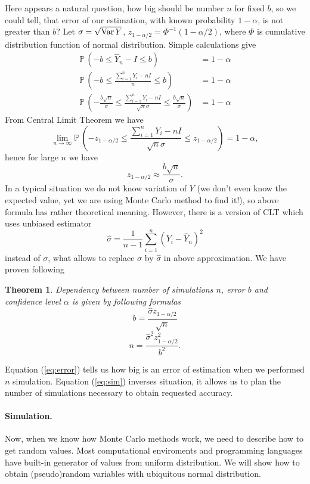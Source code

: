 \documentclass[a4paper,12pt, twoside]{article}
\newtheorem{thm}{Theorem}[section]
\theoremstyle{definition}
\theoremstyle{remark}
\def\Var{{\rm Var}\,}
\def\P{{\mathbb{P}}\,}
\def\limn{\lim\limits_{n \rightarrow \infty} }
\begin{document}
Here appears a natural question, how big should be number $n$ for fixed $b$, so we could tell, that error of our estimation, with known probability $1-\alpha$, is not greater than $b$?
Let $\sigma = \sqrt{\Var{Y}}$, $z_{1-\alpha/2} = \Phi^{-1}(1-\alpha/2)$, where $\Phi$ is cumulative distribution function of normal distribution. Simple calculations give
\begin{align*}
 \P(-b \leq \hat{Y}_n - I \leq b) &= 1 - \alpha\\
 \P(-b \leq \frac{\sum\limits_{i=1}^n Y_i - nI}{n}  \leq b) &= 1 - \alpha\\
 \P(-\frac{b\sqrt{n}}{\sigma} \leq \frac{\sum\limits_{i=1}^n Y_i - nI}{\sqrt{n}\sigma}  \leq \frac{b\sqrt{n}}{\sigma}) &= 1 - \alpha
\end{align*}
From Central Limit Theorem we have
\[ \limn \P(-z_{1-\alpha/2} \leq \frac{\sum\limits_{i=1}^n Y_i - nI}{\sqrt{n}\sigma}  \leq z_{1-\alpha/2}) = 1 - \alpha, \]
hence for large $n$ we have
\[z_{1-\alpha/2} \approx \frac{b\sqrt{n}}{\sigma}.\]
In a typical situation we do not know variation of $Y$ (we don't even know the expected value, yet we are using Monte Carlo method to find it!), so above formula has rather theoretical meaning. However, there is a version of CLT which uses unbiased estimator
\[ \hat{\sigma} = \frac{1}{n-1}\sum\limits_{i=1}^n (Y_i - \hat{Y}_n)^2 \]
instead of $\sigma$, what allows to replace $\sigma$ by $\hat{\sigma}$ in above approximation. We have proven following 
\begin{thm}
 Dependency between number of simulations $n$, error $b$ and confidence level $\alpha$ is given by following formulas
 \begin{equation}
   \label{eq:error}
   b = \frac{\hat{\sigma} z_{1-\alpha/2}}{\sqrt{n}}
 \end{equation}
 \begin{equation}
   \label{eq:sim}
   n = \frac{\hat{\sigma}^2 z_{1-\alpha/2}^2}{b^2}.
 \end{equation}
\end{thm}
\noindent Equation (\ref{eq:error}) tells us how big is an error of estimation when we performed $n$ simulation. Equation (\ref{eq:sim}) inverses situation, it allows us to plan the number of simulations necessary to obtain requested accuracy.

\paragraph{Simulation.} Now, when we know how Monte Carlo methods work, we need to describe how to get random values. Most computational enviroments and programming languages have built-in generator of values from uniform distribution. We will show how to obtain (pseudo)random variables with ubiquitous normal distribution.
\end{document}
